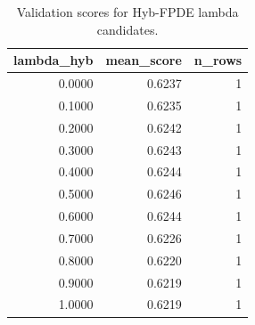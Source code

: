 \begin{table}[t]
\caption{Validation scores for Hyb-FPDE lambda candidates.}
\label{tab:lambda_distribution_computed}
\centering
\begin{tabular}{rrr}
\toprule
lambda\_hyb & mean\_score & n\_rows \\
\midrule
0.0000 & 0.6237 & 1 \\
0.1000 & 0.6235 & 1 \\
0.2000 & 0.6242 & 1 \\
0.3000 & 0.6243 & 1 \\
0.4000 & 0.6244 & 1 \\
0.5000 & 0.6246 & 1 \\
0.6000 & 0.6244 & 1 \\
0.7000 & 0.6226 & 1 \\
0.8000 & 0.6220 & 1 \\
0.9000 & 0.6219 & 1 \\
1.0000 & 0.6219 & 1 \\
\bottomrule
\end{tabular}

\end{table}
